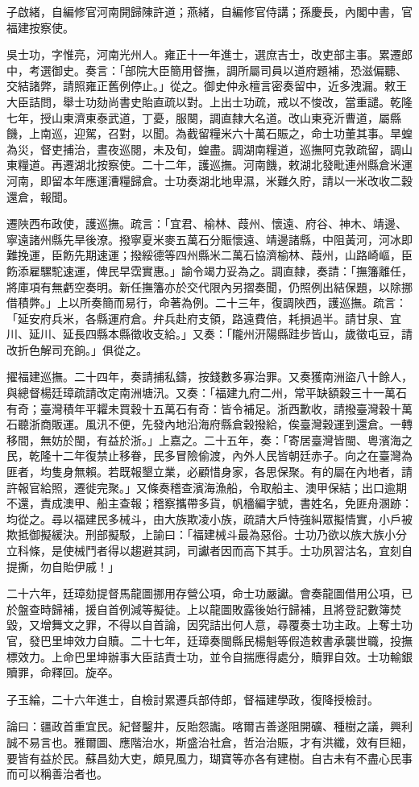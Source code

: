 \begin{pinyinscope}
子啟緒，自編修官河南開歸陳許道；燕緒，自編修官侍講；孫慶長，內閣中書，官福建按察使。

吳士功，字惟亮，河南光州人。雍正十一年進士，選庶吉士，改吏部主事。累遷郎中，考選御史。奏言：「部院大臣簡用督撫，調所屬司員以道府題補，恐滋偏聽、交結諸弊，請照雍正舊例停止。」從之。御史仲永檀言密奏留中，近多洩漏。敕王大臣詰問，舉士功劾尚書史貽直疏以對。上出士功疏，戒以不悛改，當重譴。乾隆七年，授山東濟東泰武道，丁憂，服闋，調直隸大名道。改山東兗沂曹道，屬縣饑，上南巡，迎駕，召對，以聞。為截留糧米六十萬石賑之，命士功董其事。旱蝗為災，督吏捕治，晝夜巡閱，未及旬，蝗盡。調湖南糧道，巡撫阿克敦疏留，調山東糧道。再遷湖北按察使。二十二年，護巡撫。河南饑，敕湖北發毗連州縣倉米運河南，即留本年應運漕糧歸倉。士功奏湖北地卑濕，米難久貯，請以一米改收二穀還倉，報聞。

遷陜西布政使，護巡撫。疏言：「宜君、榆林、葭州、懷遠、府谷、神木、靖邊、寧遠諸州縣先旱後潦。撥寧夏米麥五萬石分賑懷遠、靖邊諸縣，中阻黃河，河冰即難挽運，臣飭先期速運；撥綏德等四州縣米二萬石協濟榆林、葭州，山路崎嶇，臣飭添雇騾駝速運，俾民早霑實惠。」諭令竭力妥為之。調直隸，奏請：「撫籓離任，將庫項有無虧空奏明。新任撫籓亦於交代限內另摺奏聞，仍照例出結保題，以除挪借積弊。」上以所奏簡而易行，命著為例。二十三年，復調陜西，護巡撫。疏言：「延安府兵米，各縣運府倉。弁兵赴府支領，路遠費倍，耗損過半。請甘泉、宜川、延川、延長四縣本縣徵收支給。」又奏：「隴州汧陽縣跬步皆山，歲徵屯豆，請改折色解司充餉。」俱從之。

擢福建巡撫。二十四年，奏請捕私鑄，按錢數多寡治罪。又奏獲南洲盜八十餘人，與總督楊廷璋疏請改定南洲塘汛。又奏：「福建九府二州，常平缺額穀三十一萬石有奇；臺灣積年平糶未買穀十五萬石有奇：皆令補足。浙西歉收，請撥臺灣穀十萬石聽浙商販運。風汛不便，先發內地沿海府縣倉穀撥給，俟臺灣穀運到還倉。一轉移間，無妨於閩，有益於浙。」上嘉之。二十五年，奏：「寄居臺灣皆閩、粵濱海之民，乾隆十二年復禁止移眷，民多冒險偷渡，內外人民皆朝廷赤子。向之在臺灣為匪者，均隻身無賴。若既報墾立業，必顧惜身家，各思保聚。有的屬在內地者，請許報官給照，遷徙完聚。」又條奏稽查濱海漁船，令取船主、澳甲保結；出口逾期不還，責成澳甲、船主查報；稽察攜帶多貨，帆檣編字號，書姓名，免匪舟溷跡：均從之。尋以福建民多械斗，由大族欺凌小族，疏請大戶恃強糾眾擬情實，小戶被欺抵御擬緩決。刑部擬駁，上諭曰：「福建械斗最為惡俗。士功乃欲以族大族小分立科條，是使械鬥者得以趨避其詞，司讞者因而高下其手。士功夙習沽名，宜刻自提撕，勿自貽伊戚！」

二十六年，廷璋劾提督馬龍圖挪用存營公項，命士功嚴讞。會奏龍圖借用公項，已於盤查時歸補，援自首例減等擬徒。上以龍圖敗露後始行歸補，且將登記數簿焚毀，又增舞文之罪，不得以自首論，因究詰出何人意，尋覆奏士功主政。上奪士功官，發巴里坤效力自贖。二十七年，廷璋奏閩縣民楊魁等假造敕書承襲世職，投撫標效力。上命巴里坤辦事大臣詰責士功，並令自揣應得處分，贖罪自效。士功輸銀贖罪，命釋回。旋卒。

子玉綸，二十六年進士，自檢討累遷兵部侍郎，督福建學政，復降授檢討。

論曰：疆政首重宜民。紀督鑿井，反貽怨讟。喀爾吉善遂阻開礦、種樹之議，興利誠不易言也。雅爾圖、應階治水，斯盛治社倉，哲治治賑，才有洪纖，效有巨細，要皆有益於民。蘇昌劾大吏，頗見風力，瑚寶等亦各有建樹。自古未有不盡心民事而可以稱善治者也。


\end{pinyinscope}